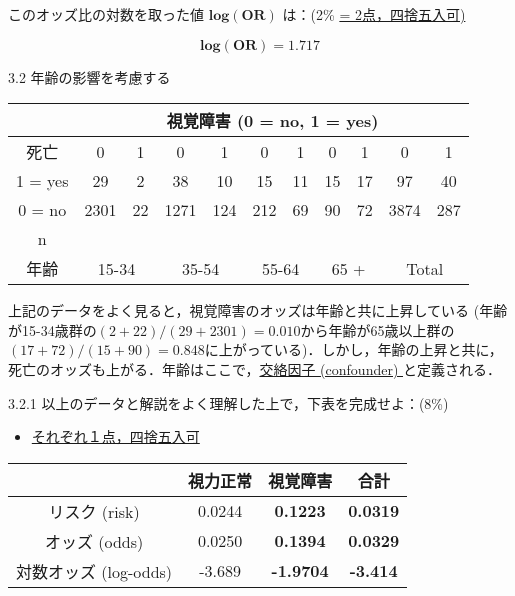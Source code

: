 \documentclass[11pt,]{problemset}
\begin{document}
このオッズ比の対数を取った値 \(\mathbf{log(OR)}\) は：(2\%
\underline{ = 2点，四捨五入可)}

\[
\mathbf{log(OR)} = 1.717
\]

3.2 年齢の影響を考慮する

\begin{center}
\begin{tabular}{|c|c|c|c|c|c|c|c|c|c|c|}
\hline
       & \multicolumn{10}{c|}{視覚障害 (0 = no, 1 = yes)}                                                                                                  \\ \hline
死亡     & 0             & 1          & 0            & 1           & 0            & 1           & 0           & 1           & 0            & 1           \\ \hline
1 = yes & 29            & 2          & 38           & 10          & 15           & 11          & 15          & 17          & 97           & 40          \\ \hline
0 = no & 2301          & 22         & 1271         & 124         & 212          & 69          & 90          & 72          & 3874         & 287         \\ \hline
  n     &           &           &          &          &           &           &           &           &          &          \\ \hline
年齢     & \multicolumn{2}{c|}{15-34} & \multicolumn{2}{c|}{35-54} & \multicolumn{2}{c|}{55-64} & \multicolumn{2}{c|}{65 +} & \multicolumn{2}{c|}{Total} \\ \hline
\end{tabular}
\end{center}

上記のデータをよく見ると，視覚障害のオッズは年齢と共に上昇している
(年齢が15-34歳群の\((2 + 22) / (29 + 2301) = 0.010\)から年齢が65歳以上群の\((17+72)/(15+90) = 0.848\)に上がっている)．しかし，年齢の上昇と共に，死亡のオッズも上がる．年齢はここで，\underline{交絡因子 (confounder) }と定義される．

3.2.1 以上のデータと解説をよく理解した上で，下表を完成せよ：(8\%)

\begin{itemize}
\item
  \underline{それぞれ１点，四捨五入可}
\end{itemize}

\begin{center}
\begin{tabular}{|c|c|c|c|}
\hline
                 & 視力正常   & 視覚障害    & 合計   \\ \hline
リスク (risk)       & 0.0244 & \bf{0.1223}  & \bf{0.0319} \\ \hline
オッズ (odds)       & 0.0250 & \bf{0.1394}  & \bf{0.0329} \\ \hline
対数オッズ (log-odds) & -3.689 & \bf{-1.9704} & \bf{-3.414} \\ \hline
\end{tabular}
\end{center}
\end{document}
